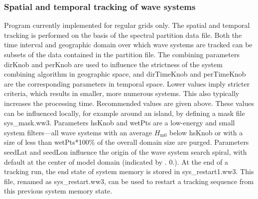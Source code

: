 \vsssub
\subsubsection{Spatial and temporal tracking of wave systems} \label{sec:ww3systrk}
\vsssub




\vspace{\baselineskip} 
\noindent 
Program currently implemented for regular grids only. The spatial and temporal
tracking is performed on the basis of the spectral partition data file. Both
the time interval and geographic domain over which wave systems are tracked
can be subsets of the data contained in the partition file. The combining
parameters {\code dirKnob} and {\code perKnob} are used to influence the
strictness of the system combining algorithm in geographic space, and {\code
  dirTimeKnob} and {\code perTimeKnob} are the corresponding parameters in
temporal space. Lower values imply stricter criteria, which results in
smaller, more numerous systems. This also typically increases the processing
time. Recommended values are given above. These values can be influenced
locally, for example around an island, by defining a mask file {\file
  sys\_mask.ww3}.  Parameters {\code hsKnob} and {\code wetPts} are a
low-energy and small system filters---all wave systems with an average
$H_\mathrm{m0}$ below {\code hsKnob} or with a size of less than {\code
  wetPts}*100\% of the overall domain size are purged. Parameters {\code
  seedLat} and {\code seedLon} influence the origin of the wave system search
spiral, with default at the center of model domain (indicated by {. 0.}). At the end of a tracking run, the end state of system memory is
stored in {\file sys\_restart1.ww3}.  This file, renamed as {\file
  sys\_restart.ww3}, can be used to restart a tracking sequence from this
previous system memory state.

\pb
